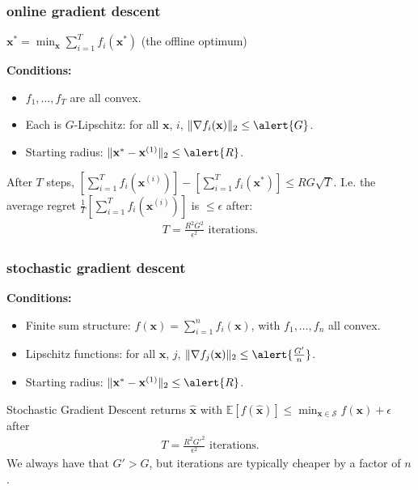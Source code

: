 \documentclass[compress]{beamer}
\newcommand{\bv}[1]{\mathbf{#1}}
\newcommand{\E}{\mathbb{E}}
\begin{document}
\begin{frame}[t]
	\frametitle{online gradient descent}
	$\bv{x}^{*} = \min_\bv{x}\sum_{i=1}^T f_i(\bv{x}^*)$ (the offline optimum)
	
	\textbf{Conditions:}
	\begin{itemize}
		\item $f_1, \ldots, f_T$ are all convex.
		\item Each is $G$-Lipschitz: for all $\bv{x}$, $i$, $\|\nabla f_i(\bv{x})\|_2 \leq \alert{G}$.
		\item Starting radius: $\|\bv{x}^{*} - \bv{x}^{(1)}\|_2 \leq \alert{R}$.
	\end{itemize}
	
	\begin{theorem}
	After $T$ steps, $\left[\sum_{i=1}^T f_i(\bv{x}^{(i)})\right] - \left[\sum_{i=1}^T f_i(\bv{x}^*)\right] \leq RG\sqrt{T}$. I.e. the average regret $\frac{1}{T}\left[\sum_{i=1}^T f_i(\bv{x}^{(i)})\right]$ is $\leq \epsilon$ after:	
	\begin{align*}
		T = \frac{R^2 G^2}{\epsilon^2} \text{ iterations.}
	\end{align*}
	\end{theorem}
\end{frame}

\begin{frame}[t]
	\frametitle{stochastic gradient descent}
	\textbf{Conditions:}
	\begin{itemize}
		\item {Finite sum structure:} $f(\bv{x}) = \sum_{i=1}^n f_i(\bv{x})$, with $f_1, \ldots, f_n$ all convex.
		\item {Lipschitz functions}: for all $\bv{x}$, $j$, $\|\nabla f_j(\bv{x})\|_2 \leq \alert{\frac{G'}{n}}$.
		\item Starting radius: $\|\bv{x}^{*} - \bv{x}^{(1)}\|_2 \leq \alert{R}$.
	\end{itemize}
	
	\begin{theorem}
		Stochastic Gradient Descent returns $\hat{\bv{x}}$ with $\E[f(\hat{\bv{x}})] \leq \min_{\bv{x}\in \mathcal{S}}f(\bv{x})+\epsilon$ after
	\begin{align*}
		T = \frac{R^2 G'^2}{\epsilon^2} \text{ iterations.}
	\end{align*}	
	We always have that $G' > G$, but iterations are typically cheaper by a factor of $n$. 
\end{theorem}
\end{frame}
\end{document}
